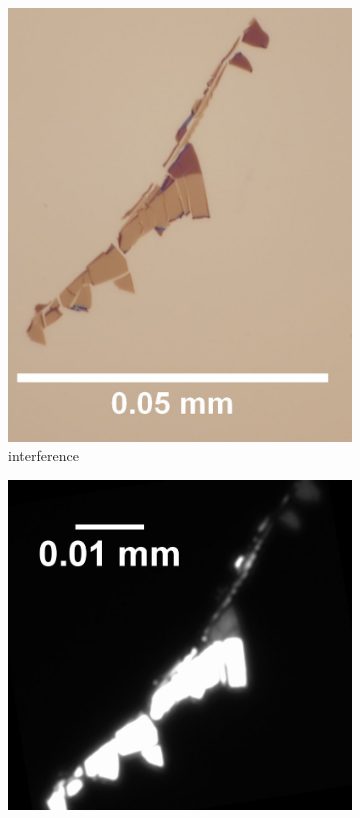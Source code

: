 \begin{figure}[!ht]
    \centering
    \begin{subfigure}{0.47\textwidth}
        \centering
        \includegraphics[width=\textwidth]{img/output_t1/M1_2_100_adj}
        \caption{interference}
	      \label{fig_mono_spec2_int}
    \end{subfigure}
    \hfill
    \begin{subfigure}{0.47\textwidth}
        \centering
        \includegraphics[width=\textwidth]{img/output_t1/M1_2_50_adj_photo}

\end{subfigure}
\end{figure}
